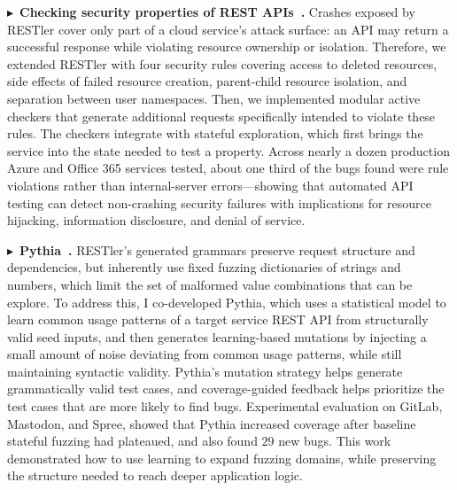 \documentclass[10pt,letterpaper]{article}
\newcommand{\project}[2]{\par\Needspace{6\baselineskip}\noindent
  $\blacktriangleright$~\textbf{#1~\cite{#2}.}}
\begin{document}
\project{Checking security properties of REST APIs}{restler2}
Crashes exposed by RESTler cover only part of a cloud service's attack surface:
an API may return a
successful response while violating resource ownership or isolation. Therefore,
we extended RESTler with four security rules covering access to deleted
resources, side effects of failed resource creation, parent-child resource
isolation, and
separation between user namespaces. Then, we implemented modular
active checkers that generate additional requests specifically intended to
violate these rules.
The checkers integrate with stateful exploration, which
first brings the service into the state needed to test a property.
Across nearly a dozen production Azure and Office 365 services tested, about
one third of
the bugs found were rule violations rather than internal-server errors---showing
that automated API testing can
detect non-crashing security failures with implications for resource hijacking, information
disclosure, and denial of service.

\project{Pythia}{pythia}
RESTler's generated grammars preserve request structure and dependencies, but
inherently use fixed fuzzing dictionaries of strings and numbers, which limit
the set of malformed value combinations that can be explore. To address this,
I co-developed Pythia, which uses a statistical model to learn common usage
patterns of a target service REST API from structurally valid seed inputs, and
then generates learning-based mutations by injecting a small amount of noise
deviating from common usage patterns, while still maintaining syntactic validity.
Pythia's mutation strategy helps generate grammatically valid test cases, and
coverage-guided feedback helps prioritize the test cases that are more likely
to find bugs. 
Experimental evaluation on GitLab, Mastodon, and Spree, showed that
Pythia increased coverage after baseline stateful fuzzing had plateaued, and
also found $29$ new bugs. This work demonstrated how
to use learning to expand fuzzing domains, while preserving the structure
needed to reach deeper application logic.
\end{document}
